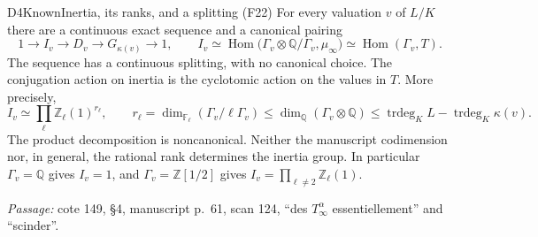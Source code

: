 \begin{result}{D4}{Known}{Inertia, its ranks, and a splitting (F22)}
For every valuation $v$ of $L/K$ there are a continuous exact sequence and a canonical pairing
\[
 1\longrightarrow I_v\longrightarrow D_v\longrightarrow G_{\kappa(v)}\longrightarrow1,
 \qquad
 I_v\simeq\operatorname{Hom}\bigl(\Gamma_v\otimes\mathbb Q/\Gamma_v,\mu_\infty\bigr)
 \simeq\operatorname{Hom}(\Gamma_v,T).
\]
The sequence has a continuous splitting, with no canonical choice. The conjugation action on inertia is the cyclotomic action on the values in $T$. More precisely,
\[
 I_v\simeq\prod_{\ell}\mathbb Z_\ell(1)^{r_\ell},\qquad
 r_\ell=\dim_{\mathbb F_\ell}(\Gamma_v/\ell\Gamma_v)
 \le\dim_{\mathbb Q}(\Gamma_v\otimes\mathbb Q)
 \le\operatorname{trdeg}_K L-\operatorname{trdeg}_K\kappa(v).
\]
The product decomposition is noncanonical. Neither the manuscript codimension nor, in general, the rational rank determines the inertia group. In particular $\Gamma_v=\mathbb Q$ gives $I_v=1$, and $\Gamma_v=\mathbb Z[1/2]$ gives $I_v=\prod_{\ell\ne2}\mathbb Z_\ell(1)$.
\par\emph{Passage:} cote 149, \S4, manuscript p.~61, scan 124, ``des $T_\infty^\alpha$ essentiellement'' and ``scinder''.
\end{result}
